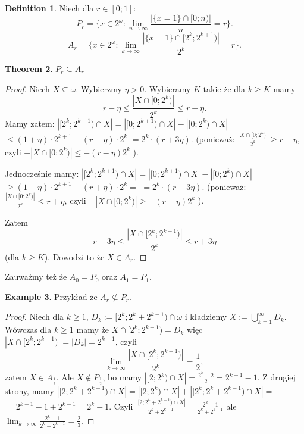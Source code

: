 \documentclass[12pt]{amsart}
\theoremstyle{plain}
\newtheorem{theorem}{Theorem}[section]
\theoremstyle{definition}
\newtheorem{definition}[theorem]{Definition}
\newtheorem{example}[theorem]{Example}
\theoremstyle{remark}
\newcommand{\ca}{2^{\omega}}
\newcommand{\cantor}{\ca}
\newcommand{\zbiorPe}[1]{P_{#1}}
\newcommand{\zbiorA}[1]{A_{#1}}
\newcommand{\laMitad}{\frac{1}{2}} %
\begin{document}
\begin{definition}
  Niech dla $r\in [0;1]$:
  \[
    \zbiorPe{r} = \lbrace x \in \cantor \colon \lim_{n\to\infty}
    \frac{|\lbrace x = 1 \rbrace \cap [0; n)|}{n} = r\rbrace.
  \]
  \[
    \zbiorA{r} = \lbrace x \in \cantor \colon \lim_{k\to\infty}
    \frac{|\lbrace x = 1 \rbrace \cap [2^k; 2^{k+1})|}{2^k} = r\rbrace.
  \]
\end{definition}

\begin{theorem}
  $\zbiorPe{r} \subseteq \zbiorA{r}$
\end{theorem}
\begin{proof}
  Niech $X \subseteq \omega$.
  Wybierzmy $\eta > 0$.
  Wybieramy $K$ takie że dla $k \geq K$
  mamy
  \[
r - \eta \leq \frac{|X \cap [0; 2^k)|}{2^k} \leq r + \eta.
\]
Mamy zatem:
$|[2^k; 2^{k+1}) \cap X| = |[0; 2^{k+1}) \cap X| - |[0; 2^k) \cap X|$
$\leq (1 + \eta) \cdot 2^{k+1} - (r - \eta) \cdot 2^k$
$=2^k \cdot (r + 3\eta)$.
\Big(ponieważ:
$\frac{|X \cap [0; 2^k)|}{2^k} \geq r - \eta$, czyli
$- |X \cap [0; 2^k)| \leq -(r - \eta) 2^k$
\Big).

Jednocześnie mamy: 
$|[2^k; 2^{k+1}) \cap X| = |[0; 2^{k+1}) \cap X| - |[0; 2^k) \cap X|$
$\geq (1 - \eta) \cdot 2^{k+1} - (r + \eta) \cdot 2^k =$
$=2^k \cdot (r - 3\eta)$.
\Big(ponieważ:
$\frac{|X \cap [0; 2^k)|}{2^k} \leq r + \eta$, czyli
$- |X \cap [0; 2^k)| \geq -(r + \eta) 2^k$
\Big).

Zatem 
\[r - 3 \eta \leq \frac{|X \cap [2^k; 2^{k + 1})|}{2^k} \leq r + 3 \eta\]
(dla $k\geq K$).
Dowodzi to że $X \in \zbiorA{r}$.
\end{proof}
  
Zauważmy też że $\zbiorA{0} = \zbiorPe{0}$ oraz
$\zbiorA{1} = \zbiorPe{1}$.

\begin{example}
Przykład że $\zbiorA{r} \not\subseteq \zbiorPe{r}$.
\end{example}
\begin{proof}
Niech dla $k \geq 1$, $D_k := [2^k; 2^k + 2^{k-1}) \cap \omega$
i kładziemy $X := \bigcup_{k = 1}^\infty D_k$.
Wówczas dla $k \geq 1$ mamy że
$X \cap [2^k; 2^{k+1}) = D_k$ więc
$|X \cap [2^k; 2^{k+1})| = |D_k| = 2^{k-1}$,
czyli
\[
  \lim_{k\to\infty} \frac{|X \cap [2^k; 2^{k+1})|}{2^k} = \laMitad,
\]
zatem $X \in \zbiorA{\laMitad}$.
Ale $X \not\in\zbiorPe{\laMitad}$, bo mamy
$|[2; 2^k) \cap X| = \frac{2^k - 2}{2} = 2^{k-1} - 1$.
Z drugiej strony, mamy
$|[2; 2^k + 2^{k-1}) \cap X| = |[2; 2^k) \cap X| + |[2^k; 2^k + 2^{k - 1}) \cap X| =$
$= 2^{k-1} - 1 + 2^{k-1} = 2^k - 1$.
Czyli
$\frac{|[2; 2^k + 2^{k-1}) \cap X|}{2^k + 2^{k-1}} = \frac{2^k - 1}{2^k + 2^{k-1}}$
ale $\lim_{k\to\infty} \frac{2^k - 1}{2^k + 2^{k-1}} = \frac{2}{3}$.
\end{proof}
\end{document}
